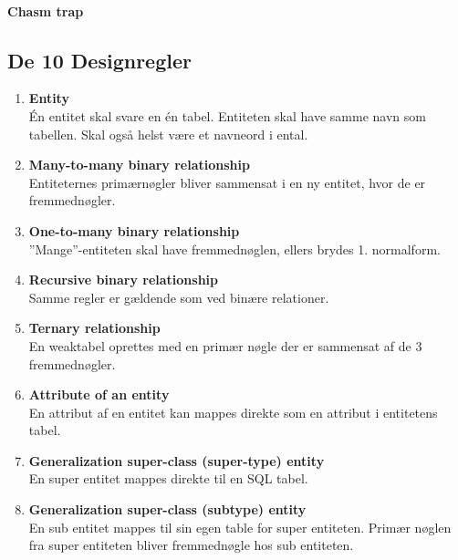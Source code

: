 \paragraph{Chasm trap} 

\subsection{De 10 Designregler}

\begin{enumerate}
	\item \textbf{Entity}\\
	Én entitet skal svare en én tabel. Entiteten skal have samme navn som tabellen. Skal også helst være et navneord i ental. 
	
	\item \textbf{Many-to-many binary relationship}\\
	Entiteternes primærnøgler bliver sammensat i en ny entitet, hvor de er fremmednøgler.
	
	\item \textbf{One-to-many binary relationship}\\
	''Mange''-entiteten skal have fremmednøglen, ellers brydes 1. normalform.
	
	\item \textbf{Recursive binary relationship}\\
	Samme regler er gældende som ved binære relationer.
	
	\item \textbf{Ternary relationship}\\
	En weaktabel oprettes med en primær nøgle der er sammensat af de 3 fremmednøgler.
	
	\item \textbf{Attribute of an entity}\\
	En attribut af en entitet kan mappes direkte som en attribut i entitetens tabel.
	
	\item \textbf{Generalization super-class (super-type) entity}\\
	En super entitet mappes direkte til en SQL tabel.
	
	\item \textbf{Generalization super-class (subtype) entity}\\
	En sub entitet mappes til sin egen table for super entiteten. Primær nøglen fra super entiteten
	bliver fremmednøgle hos sub entiteten.
	

\end{enumerate}
